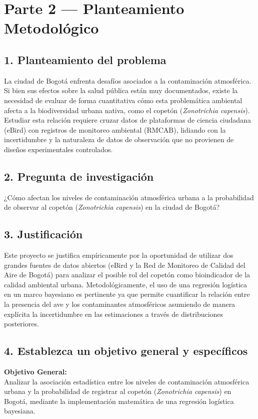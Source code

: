 \documentclass[12pt]{article}
\begin{document}
\section{Parte 2 --- Planteamiento Metodológico}

\subsection*{1. Planteamiento del problema}
La ciudad de Bogotá enfrenta desafíos asociados a la contaminación atmosférica. Si bien sus efectos sobre la salud pública están muy documentados, existe la necesidad de evaluar de forma cuantitativa cómo esta problemática ambiental afecta a la biodiversidad urbana nativa, como el copetón (\textit{Zonotrichia capensis}). Estudiar esta relación requiere cruzar datos de plataformas de ciencia ciudadana (eBird) con registros de monitoreo ambiental (RMCAB), lidiando con la incertidumbre y la naturaleza de datos de observación que no provienen de diseños experimentales controlados.

\subsection*{2. Pregunta de investigación}
¿Cómo afectan los niveles de contaminación atmosférica urbana a la probabilidad de observar al copetón (\textit{Zonotrichia capensis}) en la ciudad de Bogotá?

\subsection*{3. Justificación}
Este proyecto se justifica empíricamente por la oportunidad de utilizar dos grandes fuentes de datos abiertos (eBird y la Red de Monitoreo de Calidad del Aire de Bogotá) para analizar el posible rol del copetón como bioindicador de la calidad ambiental urbana. Metodológicamente, el uso de una regresión logística en un marco bayesiano es pertinente ya que permite cuantificar la relación entre la presencia del ave y los contaminantes atmosféricos asumiendo de manera explícita la incertidumbre en las estimaciones a través de distribuciones posteriores.

\subsection*{4. Establezca un objetivo general y específicos}

\textbf{Objetivo General:}\\
Analizar la asociación estadística entre los niveles de contaminación atmosférica urbana y la probabilidad de registrar al copetón (\textit{Zonotrichia capensis}) en Bogotá, mediante la implementación matemática de una regresión logística bayesiana.
\end{document}
